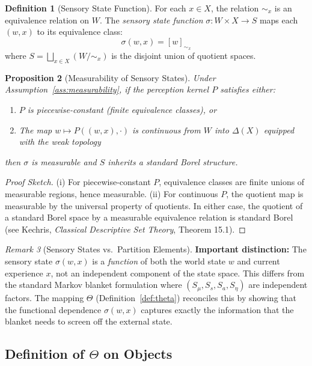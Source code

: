 \documentclass[11pt,a4paper]{article}
\theoremstyle{definition}
\newtheorem{definition}{Definition}[section]
\theoremstyle{plain}
\newtheorem{proposition}[definition]{Proposition}
\theoremstyle{remark}
\newtheorem{remark}[definition]{Remark}
\newcommand{\ProbSpace}[1]{\Delta(#1)}
\begin{document}
\begin{definition}[Sensory State Function]\label{def:sensory-state}
For each $x \in X$, the relation $\sim_x$ is an equivalence relation on $W$. The \emph{sensory state function} $\sigma: W \times X \to S$ maps each $(w, x)$ to its equivalence class:
\[
\sigma(w, x) = [w]_{\sim_x}
\]
where $S = \bigsqcup_{x \in X} (W / {\sim_x})$ is the disjoint union of quotient spaces.
\end{definition}

\begin{proposition}[Measurability of Sensory States]\label{prop:sensory-measurable}
Under Assumption~\ref{ass:measurability}, if the perception kernel $P$ satisfies either:
\begin{enumerate}[label=(\roman*)]
    \item $P$ is piecewise-constant (finite equivalence classes), or
    \item The map $w \mapsto P((w, x), \cdot)$ is continuous from $W$ into $\ProbSpace{X}$ equipped with the weak topology
\end{enumerate}
then $\sigma$ is measurable and $S$ inherits a standard Borel structure.
\end{proposition}

\begin{proof}[Proof Sketch]
(i) For piecewise-constant $P$, equivalence classes are finite unions of measurable regions, hence measurable. (ii) For continuous $P$, the quotient map is measurable by the universal property of quotients. In either case, the quotient of a standard Borel space by a measurable equivalence relation is standard Borel (see Kechris, \textit{Classical Descriptive Set Theory}, Theorem 15.1).
\end{proof}

\begin{remark}[Sensory States vs.\ Partition Elements]
\textbf{Important distinction:} The sensory state $\sigma(w, x)$ is a \emph{function} of both the world state $w$ and current experience $x$, not an independent component of the state space. This differs from the standard Markov blanket formulation where $(S_\mu, S_s, S_a, S_\eta)$ are independent factors. The mapping $\Theta$ (Definition~\ref{def:theta}) reconciles this by showing that the functional dependence $\sigma(w, x)$ captures exactly the information that the blanket needs to screen off the external state.
\end{remark}

\subsection{Definition of $\Theta$ on Objects}
\end{document}
